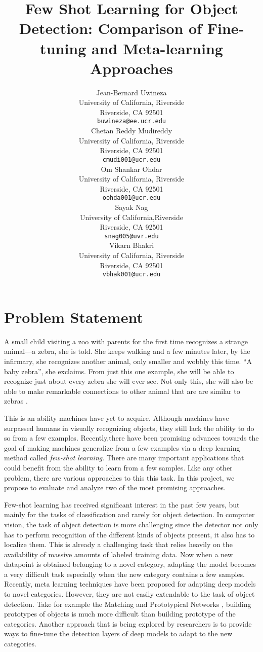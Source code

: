 \documentclass{article}
\title{Few Shot Learning for Object Detection: 
Comparison of Fine-tuning and Meta-learning Approaches}
\author{%
  Jean-Bernard Uwineza 
  \\
  University of California, Riverside\\
  Riverside, CA 92501 \\
  \texttt{buwineza@ee.ucr.edu} \\
  \And
  Chetan Reddy Mudireddy \\
  University of California, Riverside \\
  Riverside, CA 92501 \\
  \texttt{cmudi001@ucr.edu} \\
  \AND
  Om Shankar Ohdar \\
  University of California, Riverside \\
  Riverside, CA 92501 \\
  \texttt{oohda001@ucr.edu} \\
  \And
  Sayak Nag \\
  University of California,Riverside \\
  Riverside, CA 92501 \\
  \texttt{snag005@uvr.edu} \\
  \And
  Vikarn Bhakri \\
  University of California, Riverside \\
  Riverside, CA 92501 \\
  \texttt{vbhak001@ucr.edu} \\
}
\begin{document}
\maketitle


\section{Problem Statement}
A small child visiting a zoo with parents for the first time recognizes a strange animal---a zebra, she is told. She keeps walking and a few minutes later, by the infirmary, she recognizes another animal, only smaller and wobbly this time. ``A baby zebra'', she exclaims. From just this one example, she will be able to recognize just about every zebra she will ever see. Not only this, she will also be able to make remarkable connections to other animal that are are similar to zebras \cite{samuelson2005they}. 

This is an ability machines have yet to acquire. Although machines have surpassed humans in visually recognizing objects, they still lack the ability to do so from a few examples. Recently,there have been promising advances towards the goal of making machines generalize from a few examples via a deep learning method called \textit{few-shot learning}. 
There are many important applications that could benefit from the ability to learn from a few 
samples. Like any other problem, there are various approaches to this this task.
In this project, we propose to evaluate and analyze two of the most promising approaches. 

Few-shot learning has received significant interest in the past few years, 
but mainly for the tasks of classification and rarely for object detection. 
In computer vision, the task of object detection is more challenging since the detector not only has to perform recognition of the different kinds of objects present,
it also has to localize them. This is already a challenging task that relies heavily 
on the availability of massive amounts of labeled training data. Now when a new datapoint is obtained belonging to a novel category, adapting the model becomes a very difficult task especially when the new category contains a few samples. Recently, meta learning techniques have been proposed for adapting deep models to novel categories. However, they are not easily extendable to the task of object detection. Take for example the Matching \cite{VinyalsBLKW16} and Prototypical Networks \cite{snell2017prototypical}, building prototypes of objects is much more difficult than building prototype of the categories. Another approach that is being explored by researchers is to provide ways to fine-tune the detection layers of deep models to adapt to the new categories.
\end{document}
